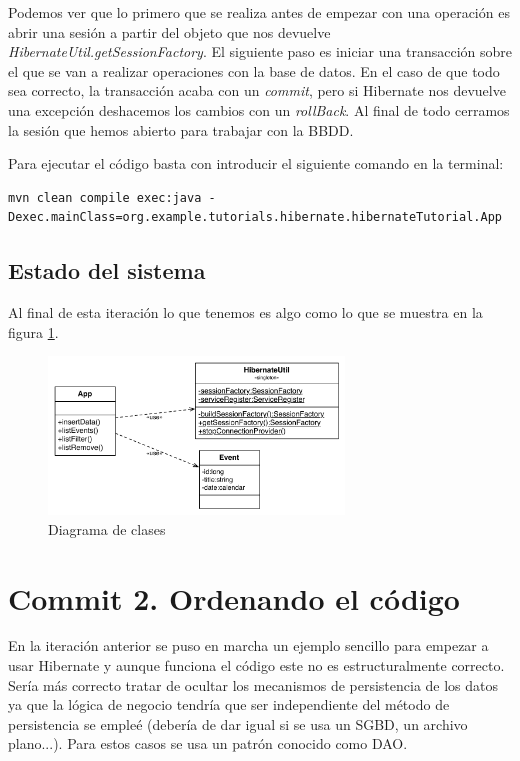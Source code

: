 \documentclass{article}
\begin{document}
	Podemos ver que lo primero que se realiza antes de empezar con una operación es abrir una sesión a partir del objeto que nos devuelve \emph{HibernateUtil.getSessionFactory}. El siguiente paso es iniciar una transacción sobre el que se van a realizar operaciones con la base de datos. En el caso de que todo sea correcto, la transacción acaba con un \emph{commit}, pero si Hibernate nos devuelve una excepción deshacemos los cambios con un \emph{rollBack}. Al final de todo cerramos la sesión que hemos abierto para trabajar con la BBDD.

	Para ejecutar el código basta con introducir el siguiente comando en la terminal:
\begin{lstlisting}[style=bash]
mvn clean compile exec:java -Dexec.mainClass=org.example.tutorials.hibernate.hibernateTutorial.App
\end{lstlisting}

\subsection{Estado del sistema}
	Al final de esta iteración lo que tenemos es algo como lo que se muestra en la figura \ref{fig:c01:UmlClass}.
\begin{figure}[h]
  \centering
    \includegraphics[width=0.7\textwidth]{commit01/img/UmlClass.pdf}
  \caption{Diagrama de clases}
  \label{fig:c01:UmlClass}
\end{figure}	
	
\section{Commit 2. Ordenando el código}\label{sec:commit2}
	En la iteración anterior se puso en marcha un ejemplo sencillo para empezar a usar Hibernate y aunque funciona el código este no es estructuralmente correcto. Sería más correcto tratar de ocultar los mecanismos de persistencia de los datos ya que la lógica de negocio tendría que ser independiente del método de persistencia se empleé (debería de dar igual si se usa un SGBD, un archivo plano...). Para estos casos se usa un patrón conocido como DAO\cite{Dao}.
\end{document}

